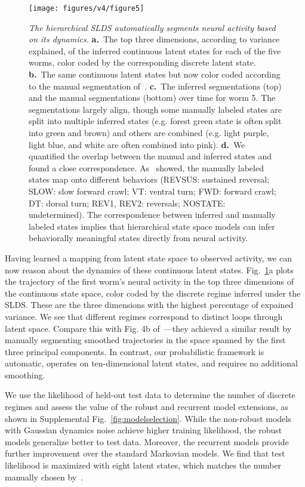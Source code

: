 \documentclass[11pt]{article}
\begin{document}
\begin{figure}[t!]
\centering
\texttt{[image: figures/v4/figure5]} 
\caption{ \textit{The hierarchical SLDS automatically segments neural
    activity based on its dynamics.}  \textbf{a.}~The top three
  dimensions, according to variance explained, of the inferred
  continuous latent states for each of the five worms, color coded by
  the corresponding discrete latent state.  \textbf{b.}~The same
  continuous latent states but now color coded according to the manual
  segmentation of~\citet{kato2015global}.  \textbf{c.}~The inferred
  segmentations (top) and the manual segmentations (bottom) over time
  for worm 5. The segmentations largely align, though some manually
  labeled states are split into multiple inferred states (e.g. forest
  green state is often split into green and brown) and others are
  combined (e.g. light purple, light blue, and white are often
  combined into pink).  \textbf{d.}~We quantified the overlap between
  the manual and inferred states and found a close correspondence.
  As~\citet{kato2015global} showed, the manually labeled states map
  onto different behaviors (\textsf{REVSUS}: sustained reversal;
  \textsf{SLOW}: slow forward crawl; \textsf{VT}: ventral turn;
  \textsf{FWD}: forward crawl; \textsf{DT}: dorsal turn; \textsf{REV1,
    REV2}: reversals; \textsf{NOSTATE}: undetermined). The
  correspondence between inferred and manually labeled states implies
  that hierarchical state space models can infer behaviorally
  meaningful states directly from neural activity.}
\label{fig:syllables}
\end{figure}

Having learned a mapping from latent state space to observed activity,
we can now reason about the dynamics of these continuous latent
states. Fig.~\ref{fig:syllables}a plots the trajectory of the first
worm's neural activity in the top three dimensions of the continuous
state space, color coded by the discrete regime inferred under the
SLDS.  These are the three dimensions with the highest percentage of
expained variance. We see that different regimes correspond to
distinct loops through latent space.  Compare this with Fig. 4b
of~\citet{kato2015global}---they achieved a similar result by manually
segmenting smoothed trajectories in the space spanned by the first
three principal components.  In contrast, our probabilistic framework
is automatic, operates on ten-dimensional latent states, and requires
no additional smoothing.

We use the likelihood of held-out test data to determine
the number of discrete regimes and assess the value of the robust and
recurrent model extensions, as shown in Supplemental Fig.~\ref{fig:modelselection}.
While the non-robust models with Gaussian dynamics noise achieve
higher training likelihood, the robust models generalize better to
test data.  Moreover, the recurrent models provide further improvement
over the standard Markovian models.  We find that test likelihood is
maximized with eight latent states, which matches the number manually
chosen by~\citet{kato2015global}.
\end{document}
